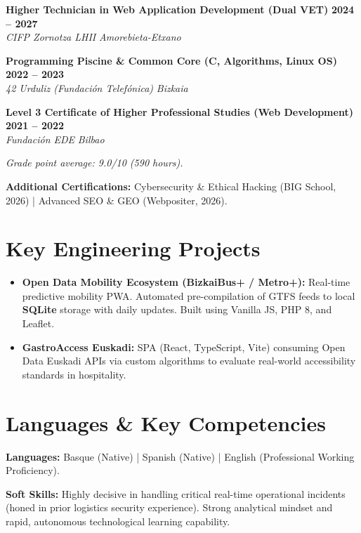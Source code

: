 \documentclass[a4paper,10pt]{article}
\newcommand{\jobheader}[4]{
    \noindent\textbf{#1} \hfill \textbf{#2} \\
    \textit{#3} \hfill \textit{#4} \vspace{3pt}
}
\begin{document}
\jobheader{Higher Technician in Web Application Development (Dual VET)}{2024 -- 2027}{CIFP Zornotza LHII}{Amorebieta-Etxano}
\vspace{3pt}

\jobheader{Programming Piscine \& Common Core (C, Algorithms, Linux OS)}{2022 -- 2023}{42 Urduliz (Fundación Telefónica)}{Bizkaia}
\vspace{3pt}

\jobheader{Level 3 Certificate of Higher Professional Studies (Web Development)}{2021 -- 2022}{Fundación EDE}{Bilbao}
\small \textit{Grade point average: 9.0/10 (590 hours).}
\vspace{4pt}

\noindent \textbf{Additional Certifications:} Cybersecurity \& Ethical Hacking (BIG School, 2026) | Advanced SEO \& GEO (Webpositer, 2026).

\section{Key Engineering Projects}

\begin{itemize}[leftmargin=12pt, itemsep=4pt, topsep=4pt]
    \item \textbf{Open Data Mobility Ecosystem (BizkaiBus+ / Metro+):} Real-time predictive mobility PWA. Automated pre-compilation of GTFS feeds to local \textbf{SQLite} storage with daily updates. Built using Vanilla JS, PHP 8, and Leaflet.
    \item \textbf{GastroAccess Euskadi:} SPA (React, TypeScript, Vite) consuming Open Data Euskadi APIs via custom algorithms to evaluate real-world accessibility standards in hospitality.
\end{itemize}

\section{Languages \& Key Competencies}

\noindent \textbf{Languages:} Basque (Native) | Spanish (Native) | English (Professional Working Proficiency).
\vspace{4pt}

\noindent \textbf{Soft Skills:} Highly decisive in handling critical real-time operational incidents (honed in prior logistics security experience). Strong analytical mindset and rapid, autonomous technological learning capability.
\end{document}
